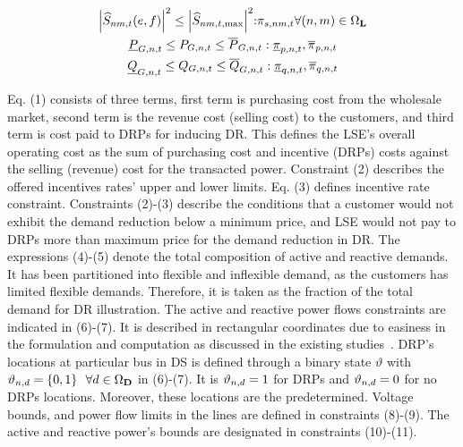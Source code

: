 \documentclass[journal]{IEEEtran}
\begin{document}
\begin{gather}
{\left| {{{\widehat S}_{nm,t}}(e,f)} \right|^2} \le {\left| {{{\widehat S}_{nm,t,\max }}} \right|^2}{\rm{:}}{\pi _{s,nm,t}}{\rm{      }}\forall (n,m) \in {\Omega _\textbf{L}}\\
{\underline P _{G,n,t}} \le {P_{G,n,t}} \le {\overline P _{G,n,t}}:{\underline \pi  _{p,n,t}},{\overline \pi  _{p,n,t}}\\
{\underline Q _{G,n,t}} \le {Q_{G,n,t}} \le {\overline Q _{G,n,t}}:{\underline \pi  _{q,n,t}},{\overline \pi  _{q,n,t}}
\end{gather}

Eq. (1) consists of three terms, first term is purchasing cost from the wholesale market, second term is the revenue cost (selling cost) to the customers, and third term is cost paid to DRPs for inducing DR. This defines the LSE's overall operating cost as the sum of purchasing cost and incentive (DRPs) costs against the selling (revenue) cost for the transacted power. Constraint (2) describes the offered incentives rates' upper and lower limits. Eq. (3) defines incentive rate constraint. Constraints (2)-(3) describe the conditions that a customer would not exhibit the demand reduction below a minimum price, and LSE would not pay to DRPs more than maximum price for the demand reduction in DR\mbox{\cite{li2016dynamic}}. The expressions (4)-(5) denote the total composition of active and reactive demands. It has been partitioned into flexible and inflexible demand, as the customers has limited flexible demands. Therefore, it is taken as the fraction of the total demand for DR illustration. The active and reactive power flows constraints are indicated in (6)-(7). It is described in rectangular coordinates due to easiness in the formulation and computation as discussed in the existing studies~\cite{bautista2007formulation,haghighat2012bilevel}. DRP's locations at particular bus in DS is defined through a binary state $\vartheta$ with ${\vartheta _{n,d}} = \{ 0,1\} {\rm{  }}~~\forall d \in {\Omega _\textbf{D}}$ in (6)-(7). It is ${\vartheta _{n,d}} = 1 {\rm{  }}$ for DRPs and ${\vartheta _{n,d}} = 0 {\rm{  }}$ for no DRPs locations. Moreover, these locations are the predetermined. Voltage bounds, and power flow limits in the lines are defined in constraints (8)-(9). The active and reactive power's bounds are designated in constraints (10)-(11). 
\end{document}
